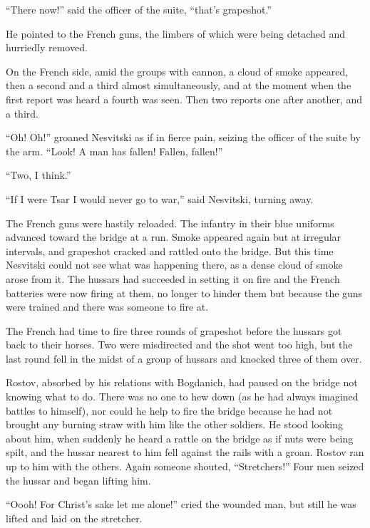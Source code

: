 ``There now!'' said the officer of the suite, ``that's
grapeshot.''

He pointed to the French guns, the limbers of which were being
detached and hurriedly removed.

On the French side, amid the groups with cannon, a cloud of smoke
appeared, then a second and a third almost simultaneously, and at
the moment when the first report was heard a fourth was
seen. Then two reports one after another, and a third.

``Oh! Oh!'' groaned Nesvitski as if in fierce pain, seizing the
officer of the suite by the arm. ``Look! A man has fallen!
Fallen, fallen!''

``Two, I think.''

``If I were Tsar I would never go to war,'' said Nesvitski,
turning away.

The French guns were hastily reloaded. The infantry in their blue
uniforms advanced toward the bridge at a run. Smoke appeared
again but at irregular intervals, and grapeshot cracked and
rattled onto the bridge. But this time Nesvitski could not see
what was happening there, as a dense cloud of smoke arose from
it. The hussars had succeeded in setting it on fire and the
French batteries were now firing at them, no longer to hinder
them but because the guns were trained and there was someone to
fire at.

The French had time to fire three rounds of grapeshot before the
hussars got back to their horses. Two were misdirected and the
shot went too high, but the last round fell in the midst of a
group of hussars and knocked three of them over.

Rostov, absorbed by his relations with Bogdanich, had paused on
the bridge not knowing what to do. There was no one to hew down
(as he had always imagined battles to himself), nor could he help
to fire the bridge because he had not brought any burning straw
with him like the other soldiers. He stood looking about him,
when suddenly he heard a rattle on the bridge as if nuts were
being spilt, and the hussar nearest to him fell against the rails
with a groan. Rostov ran up to him with the others. Again someone
shouted, ``Stretchers!'' Four men seized the hussar and began
lifting him.

``Oooh! For Christ's sake let me alone!'' cried the wounded man,
but still he was lifted and laid on the stretcher.

